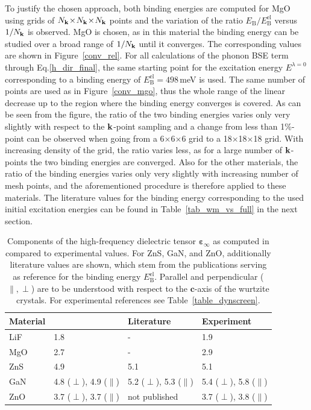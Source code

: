 To justify the chosen approach, both binding energies are computed for MgO using grids of $N_{\mathbf{k}}\!\times\!N_{\mathbf{k}}\!\times\!N_{\mathbf{k}}$ points and the variation of the ratio  $E_{\text{B}}^{\phantom{l}}/E^\text{el}_{\text{B}}$ versus~$1/N_{\mathbf{k}}$ is observed. MgO is chosen, as in this material the  binding energy can be studied over a broad range of $1/N_{\mathbf{k}}$ until it converges. The corresponding values are shown in Figure~\ref{conv_rel}. For all calculations of the phonon BSE term through Eq.\;\eqref{h_dir_final}, the same starting point for the excitation energy $E^{\lambda=0}$ corresponding to a binding energy of $E^\text{el}_\text{B}=498$\,meV is used. The same number of points are used as in Figure~\ref{conv_mgo}, thus the whole range of the linear decrease up to the region where the binding energy converges is covered. As can be seen from the figure, the ratio of the two binding energies varies only very slightly with respect to the $\mathbf{k}$-point sampling and a change from less than 1\%-point can be observed when going from a 6$\times$6$\times$6 grid to a 18$\times$18$\times$18 grid. With increasing density of the grid, the ratio varies less, as for a large number of $\mathbf{k}$-points the two binding energies are converged. Also for the other materials, the ratio of the binding energies varies only very slightly with increasing number of mesh points, and the aforementioned procedure is therefore applied to these materials. The literature values for the binding energy corresponding to the used initial excitation energies can be found in Table~\ref{tab_wm_vs_full} in the next section.\par
 \begin{table}[t]
\captionsetup{format=plain}
\caption[High-frequency dielectric tensor $\boldsymbol{\varepsilon}_\infty$ computed in \exciting{} and in the literature.]{Components of the high-frequency dielectric tensor $\boldsymbol{\varepsilon}_\infty$ as computed in \exciting{} compared to experimental values. For ZnS, GaN, and ZnO, additionally literature values\cite{draxl_gan,zns_bse,zno_bse} are shown, which stem from the publications serving as reference for the binding energy $E^\text{el}_\text{B}$. Parallel and perpendicular ($\parallel,\perp$) are to be understood with respect to the $\mathbf{c}$-axis of the wurtzite crystals. For experimental references see Table~\ref{table_dynscreen}.}
\vspace{1mm}
    \centering
    \begin{tabularx}{\textwidth}{YYYY}
    \hline
    \hline
     Material & \exciting{} & Literature & Experiment \\
     \hline
    LiF & 1.8 & -   & 1.9 \\
    MgO & 2.7 & - & 2.9\\
    ZnS & 4.9 & 5.1  & 5.1 \\
    GaN & 4.8 ($\perp$), 4.9 ($\parallel$) & 5.2 ($\perp$),  5.3 ($\parallel$) & 5.4 ($\perp$), 5.8 ($\parallel$)\\
    ZnO & 3.7 ($\perp$), 3.7 ($\parallel$) & not published  &  3.7 ($\perp$), 3.8 ($\parallel$)\\
    \hline
    \hline
    \end{tabularx}
    \label{tab_highfreq_screen}
\end{table}
